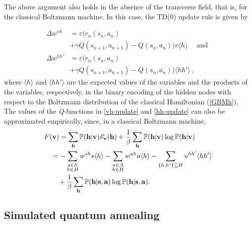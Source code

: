 \documentclass[pra,twocolumn,floatfix,superscriptaddress]{revtex4}
\begin{document}
The above argument also holds in the absence of the transverse field, that is, for the classical Boltzmann machine. In this case, the TD(0) update rule is given by

\begin{align}
\Delta w^{vh} &= \label{vh-update} 
\varepsilon  (r_n({s}_n, {a}_n)\\ 
&+\gamma Q ({s}_{n+1}, {a}_{n+1}) - Q({s}_n,{a}_n) ) v \langle h \rangle\quad \text{ and } \nonumber\\
\Delta w^{hh'} &=\label{hh-update}
\varepsilon (r_n({s}_n, {a}_n) \\
&+\gamma Q ({s}_{n+1}, {a}_{n+1}) - Q({s}_n,{a}_n) ) \langle hh' \rangle\,, \nonumber
\end{align}
where $\langle h \rangle$ and $\langle h h' \rangle$ are the expected values of the variables and the products of the variables, respectively, in the binary encoding of the hidden nodes with respect to the Boltzmann distribution of the classical Hamiltonian (\ref{GBMh}). 
%
%
The values of the \emph{Q}-functions in \eqref{vh-update} and \eqref{hh-update} can also be approximated empirically, since, in a classical Boltzmann machine, 
\begin{align}
\label{freeen}
&F (\bold{v}) = \sum_{\bold{h}}\mathbb{P}(\bold{h}|\bold{v}) \mathscr{E}_{\bold v} (\bold{h}) + \frac{1}\beta
\sum_{\bold{h}}\mathbb{P}(\bold{h}|\bold{v}) \log \mathbb{P}(\bold{h}|\bold{v})\\
&\quad= - \sum_{\substack{s \in S\\h \in H}}w^{sh}s \langle h\rangle -  \sum_{\substack{a \in A\\h \in H}} w^{ah}a \langle h\rangle - \sum_{\{h, h'\} \subseteq H} u^{hh'}\langle hh'\rangle \nonumber \\
&\quad\quad + \frac{1}\beta \sum_{\bold{h}}\mathbb{P}(\bold{h}|\bold{s}, \bold{a}) \log \mathbb{P}(\bold{h}|\bold{s}, \bold{a}). \nonumber
\end{align}

\subsection{Simulated quantum annealing}
\label{sec:sqa}
\end{document}
